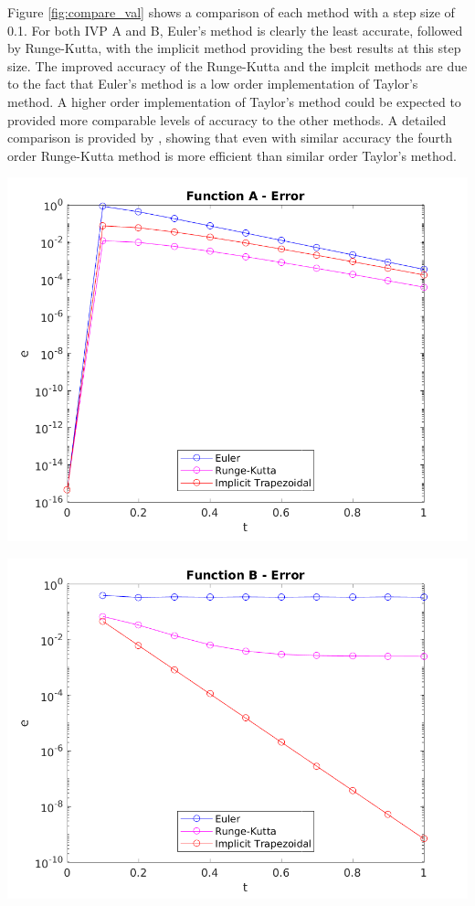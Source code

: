 \documentclass{article}
\begin{document}
Figure \ref{fig:compare_val} shows a comparison of each method with a step size of 0.1. For both IVP A and B, Euler's method is clearly the least accurate, followed by Runge-Kutta, with the implicit method providing the best results at this step size. The improved accuracy of the Runge-Kutta and the implcit methods are due to the fact that Euler's method is a low order implementation of Taylor's method. A higher order implementation of Taylor's method could be expected to provided more comparable levels of accuracy to the other methods. A detailed comparison is provided by \cite{burden2010}, showing that even with similar accuracy the fourth order Runge-Kutta method is more efficient than similar order Taylor's method. 

\begin{center}
	\centering
    \begin{minipage}{0.5\textwidth}
        \centering
	    \includegraphics[width=1\textwidth]{../output/a_compare_err.png}
    \end{minipage}\hfill
    \begin{minipage}{0.5\textwidth}
        \centering
	    \includegraphics[width=1\textwidth]{../output/b_compare_err.png}
    \end{minipage}
 	\label{fig:compare_err}
\end{center}
\end{document}
